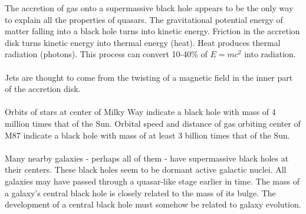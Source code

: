 \documentclass[12pt]{article}
\begin{document}
The accretion of gas onto a supermassive black hole appears to be the only way to explain all the properties of quasars. The gravitational potential energy of matter falling into a black hole turns into kinetic energy. Friction in the accretion disk turns kinetic energy into thermal energy (heat). Heat produces thermal radiation (photons). This process can convert 10-40\% of $E = mc^2$ into radiation. \\~\\ 
Jets are thought to come from the twisting of a magnetic field in the inner part of the accretion disk. \\~\\
Orbits of stars at center of Milky Way indicate a black hole with mass of 4 million times that of the Sun. Orbital speed and distance of gas orbiting center of M87 indicate a black hole with mass of at least 3 billion times that of the Sun. \\~\\ 
Many nearby galaxies - perhaps all of them - have supermassive black holes at their centers. These black holes seem to be dormant active galactic nuclei. All galaxies may have passed through a
quasar-like stage earlier in time. The mass of a galaxy's central black hole is closely related to the mass of its bulge. The development of a central black hole must somehow be related to galaxy evolution. 
\end{document}
